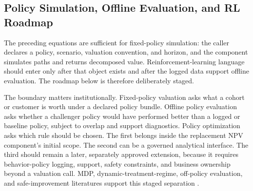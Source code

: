 \documentclass[11pt]{article}
\newcommand{\1}{\mathbf{1}}
\begin{document}
\subsection{Policy Simulation, Offline Evaluation, and RL Roadmap}

The preceding equations are sufficient for fixed-policy simulation: the caller
declares a policy, scenario, valuation convention, and horizon, and the
component simulates paths and returns decomposed value. Reinforcement-learning
language should enter only after that object exists and after the logged data
support offline evaluation. The roadmap below is therefore deliberately staged.

The boundary matters institutionally. Fixed-policy valuation asks what a cohort
or customer is worth under a declared policy bundle. Offline policy evaluation
asks whether a challenger policy would have performed better than a logged or
baseline policy, subject to overlap and support diagnostics. Policy optimization
asks which rule should be chosen. The first belongs inside the replacement NPV
component's initial scope. The second can be a governed analytical interface.
The third should remain a later, separately approved extension, because it
requires behavior-policy logging, support, safety constraints, and business
ownership beyond a valuation call. MDP, dynamic-treatment-regime, off-policy
evaluation, and safe-improvement literatures support this staged separation
\citep{puterman1994mdp,murphy2003dynamic,jiangli2016dr,
huwager2021pomdpope,laroche2019spibb,khraishiokhrati2022offlinecredit}.
\end{document}
